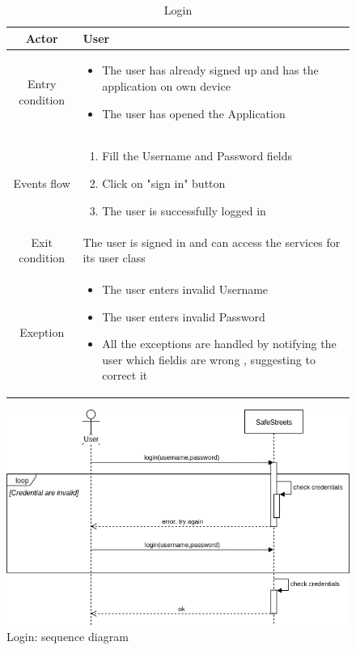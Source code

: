 \documentclass{article}
\begin{document}
	\begin{figure}[H]
		\begin{table} [H]
		\begin{center}
		\caption{Login}
		\begin{tabular}{|c|p{8cm}|}
			\hline
			Actor			&	User\\
			\hline
			Entry condition	&	\begin{itemize}[noitemsep,topsep=0pt]
									\item The user has already signed up and has 
									the application on own device
									\item The user has opened the Application
								\end{itemize}\\
			\hline
			Events flow		&	\begin{enumerate}[noitemsep,topsep=0pt]
									\item Fill the Username and Password fields 
									\item Click on "sign in" button
									\item The user is successfully logged in 
								\end{enumerate}\\
			\hline
			Exit condition	&	The user is signed in and can access the services 
								for its user class\\
			\hline
			Exeption			&	\begin{itemize}[noitemsep,topsep=0pt]
									\item The user enters invalid Username
									\item The user enters invalid Password
									\item All the exceptions are handled by notifying 
									the user which fieldis are wrong , suggesting to correct it
								\end{itemize}\\
			\hline
		\end{tabular}
		\end{center}
		\end{table} 
		
		\centering
		\includegraphics[width=\linewidth]{Images/Login_sequence_diagram.png}
		\caption{Login: sequence diagram}
	\end{figure}
	
\end{document}
